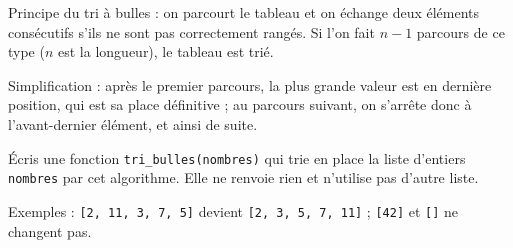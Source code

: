 Principe du tri à bulles : on parcourt le tableau et on échange deux éléments consécutifs s'ils ne sont pas correctement rangés. Si l'on fait $n - 1$ parcours de ce type ($n$ est la longueur), le tableau est trié.

Simplification : après le premier parcours, la plus grande valeur est en dernière position, qui est sa place définitive ; au parcours suivant, on s'arrête donc à l'avant-dernier élément, et ainsi de suite.

Écris une fonction \texttt{tri\_bulles(nombres)} qui trie en place la liste d'entiers \texttt{nombres} par cet algorithme. Elle ne renvoie rien et n'utilise pas d'autre liste.

Exemples : \texttt{[2, 11, 3, 7, 5]} devient \texttt{[2, 3, 5, 7, 11]} ; \texttt{[42]} et \texttt{[]} ne changent pas.
